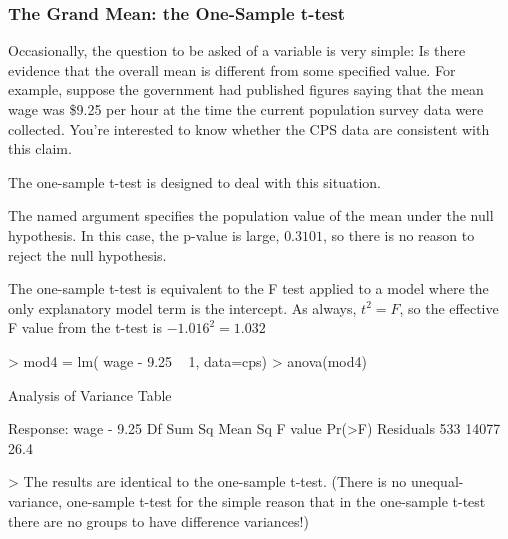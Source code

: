 \subsubsection{The Grand Mean: the One-Sample t-test}

Occasionally, the question to be asked of a variable is very simple:
Is there evidence that the overall mean is different from some specified
value.  For example, suppose the government had published figures
saying that the mean wage was \$9.25 per hour 
at the time the current population survey
data were collected.  You're interested to know whether the CPS data
are consistent with this claim.  

The one-sample t-test is designed to deal with this situation.
\begin{Schunk}
\end{Schunk}
The named argument  specifies the population value of
the mean under the null hypothesis.  In this case, the p-value is
large, $0.3101$, so there is no reason to reject the null hypothesis.

The one-sample t-test is equivalent to the F test applied to a model
where the only explanatory model term is the intercept.  As always,
$t^2 = F$, so the effective F value from the t-test is $-1.016^2 = 1.032$
\begin{Schunk}
\begin{Sinput}
> mod4 = lm( wage - 9.25 ~ 1, data=cps)
> anova(mod4)
\end{Sinput}
\begin{Soutput}
Analysis of Variance Table

Response: wage - 9.25
           Df Sum Sq Mean Sq F value Pr(>F)
Residuals 533  14077    26.4               
\end{Soutput}
\end{Schunk}
> 
The results are identical to the one-sample t-test. (There is no
unequal-variance, one-sample t-test for the simple reason that in the
one-sample t-test there are no groups to have difference variances!)

